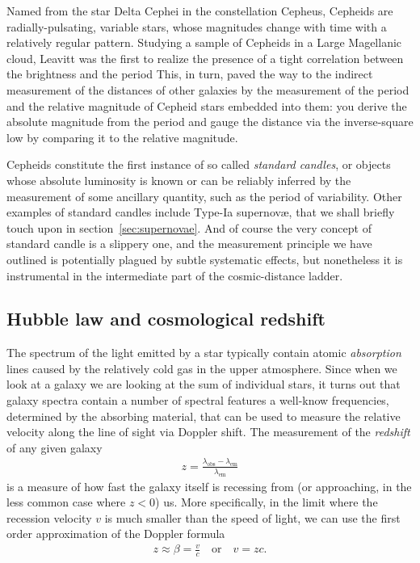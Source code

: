 Named from the star Delta Cephei in the constellation Cepheus, Cepheids are
radially-pulsating, variable stars, whose magnitudes change with time with a relatively
regular pattern. Studying a sample of Cepheids in a Large Magellanic cloud, Leavitt
was the first to realize the presence of a tight correlation between the brightness
and the period This, in
turn, paved the way to the indirect measurement of the distances of other galaxies
by the measurement of the period and the relative magnitude of Cepheid stars embedded
into them: you derive the absolute magnitude from the period and gauge the distance
via the inverse-square low by comparing it to the relative magnitude.

Cepheids constitute the first instance of so called \emph{standard candles}, or
objects whose absolute luminosity is known or can be reliably inferred by the
measurement of some ancillary quantity, such as the period of variability. Other
examples of standard candles include Type-Ia supernov\ae, that we shall briefly
touch upon in section~\ref{sec:supernovae}. And of course the very concept of standard
candle is a slippery one, and the measurement principle we have outlined is potentially
plagued by subtle systematic effects, but nonetheless it is instrumental in the
intermediate part of the cosmic-distance ladder.



\subsection{Hubble law and cosmological redshift}
\label{sec:hubble_law}

The spectrum of the light emitted by a star typically contain atomic \emph{absorption}
lines caused by the relatively cold gas in the upper atmosphere. Since when we look
at a galaxy we are looking at the sum of individual stars, it turns
out that galaxy spectra contain a number of spectral features a well-know frequencies,
determined by the absorbing material, that can be used to measure the relative velocity
along the line of sight via Doppler shift. The measurement of the \emph{redshift}
of any given galaxy
\begin{align}
	z = \frac{\lambda_\text{obs} - \lambda_\text{em}}{\lambda_\text{em}}
\end{align}
is a measure of how fast the galaxy itself is recessing from (or approaching, in
the less common case where $z < 0$) us. More specifically, in the limit where the
recession velocity $v$ is much smaller than the speed of light, we can use the
first order approximation of the Doppler formula
\begin{align*}
	z \approx \beta = \frac{v}{c} \quad\text{or}\quad v = zc.
\end{align*}


